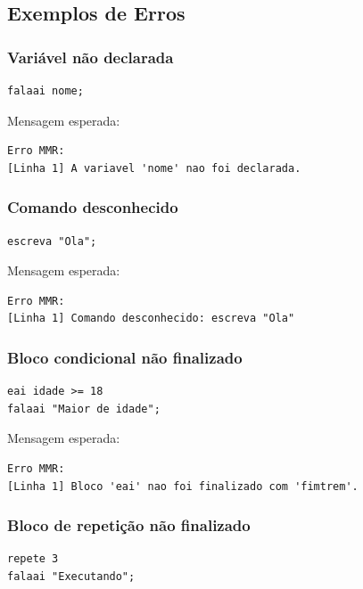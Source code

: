 \documentclass[12pt,a4paper]{article}
\begin{document}
\subsection{Exemplos de Erros}

\subsubsection{Variável não declarada}

\begin{lstlisting}
falaai nome;
\end{lstlisting}

Mensagem esperada:

\begin{lstlisting}
Erro MMR:
[Linha 1] A variavel 'nome' nao foi declarada.
\end{lstlisting}

\subsubsection{Comando desconhecido}

\begin{lstlisting}
escreva "Ola";
\end{lstlisting}

Mensagem esperada:

\begin{lstlisting}
Erro MMR:
[Linha 1] Comando desconhecido: escreva "Ola"
\end{lstlisting}

\subsubsection{Bloco condicional não finalizado}

\begin{lstlisting}
eai idade >= 18
falaai "Maior de idade";
\end{lstlisting}

Mensagem esperada:

\begin{lstlisting}
Erro MMR:
[Linha 1] Bloco 'eai' nao foi finalizado com 'fimtrem'.
\end{lstlisting}

\subsubsection{Bloco de repetição não finalizado}

\begin{lstlisting}
repete 3
falaai "Executando";
\end{lstlisting}
\end{document}

